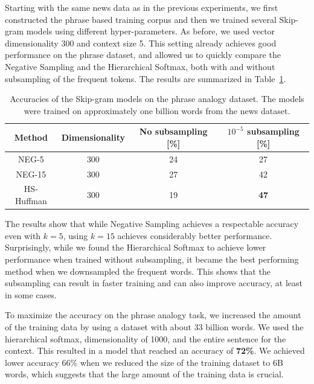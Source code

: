 \documentclass{article}
\begin{document}
Starting with the same news data as in the previous experiments,
we first constructed the phrase based training corpus and then we trained several
Skip-gram models using different hyper-parameters. As before, we used vector
dimensionality 300 and context size 5. This
setting already achieves good performance on the phrase
dataset, and allowed us to quickly compare the Negative Sampling
and the Hierarchical Softmax, both with and without subsampling
of the frequent tokens. The results are summarized in Table~\ref{table:phrase_basic_results}.
\begin{table}[b]
\small
\begin{center}
  \begin{tabular}{|c|c|c|c|}
    \hline
    Method & Dimensionality & No subsampling [\%] & $10^{-5}$ subsampling [\%] \\
    \hline
    NEG-5  &    300         & 24                  & 27                      \\
    NEG-15 &    300         & 27                  & 42                      \\
    HS-Huffman & 300        & 19                  & {\bf 47}                \\
    \hline
  \end{tabular}
\end{center}
\caption{
\label{table:phrase_basic_results}
Accuracies of the Skip-gram models on the phrase analogy dataset. The models were
trained on approximately one billion words from the news dataset.}
\end{table}

The results show that while Negative Sampling achieves a respectable
accuracy even with $k=5$, using $k=15$ achieves considerably better
performance. Surprisingly, while we found the Hierarchical Softmax to
achieve lower performance when trained without subsampling,
it became the best performing method when we
downsampled the frequent words. This shows that the subsampling
can result in faster training and can also improve accuracy, at least in some cases.

To maximize the accuracy on the phrase analogy task, we increased
the amount of the training data by using a dataset with about 33 billion words. We
used the hierarchical softmax, dimensionality of 1000, and
the entire sentence for the context.
This resulted in a model that reached an accuracy of {\bf 72\%}. We achieved lower accuracy
66\% when we reduced the size of the training dataset to 6B words, which suggests
that the large amount of the training data is crucial.
\end{document}
